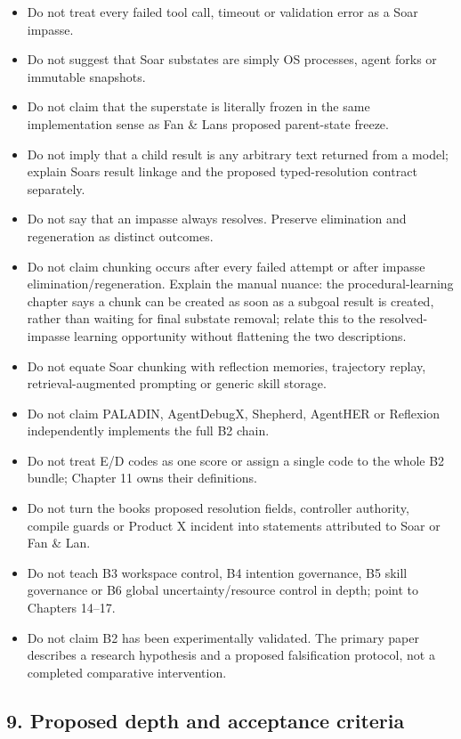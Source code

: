 \begin{itemize}
\tightlist
\item
  Do not treat every failed tool call, timeout or validation error as a Soar impasse.
\item
  Do not suggest that Soar substates are simply OS processes, agent forks or immutable snapshots.
\item
  Do not claim that the superstate is literally frozen in the same implementation sense as Fan \& Lan\textquotesingle s proposed parent-state freeze.
\item
  Do not imply that a child result is any arbitrary text returned from a model; explain Soar\textquotesingle s result linkage and the proposed typed-resolution contract separately.
\item
  Do not say that an impasse always resolves. Preserve elimination and regeneration as distinct outcomes.
\item
  Do not claim chunking occurs after every failed attempt or after impasse elimination/regeneration. Explain the manual nuance: the procedural-learning chapter says a chunk can be created as soon as a subgoal result is created, rather than waiting for final substate removal; relate this to the resolved-impasse learning opportunity without flattening the two descriptions.
\item
  Do not equate Soar chunking with reflection memories, trajectory replay, retrieval-augmented prompting or generic skill storage.
\item
  Do not claim PALADIN, AgentDebugX, Shepherd, AgentHER or Reflexion independently implements the full B2 chain.
\item
  Do not treat E/D codes as one score or assign a single code to the whole B2 bundle; Chapter 11 owns their definitions.
\item
  Do not turn the book\textquotesingle s proposed resolution fields, controller authority, compile guards or Product X incident into statements attributed to Soar or Fan \& Lan.
\item
  Do not teach B3 workspace control, B4 intention governance, B5 skill governance or B6 global uncertainty/resource control in depth; point to Chapters 14--17.
\item
  Do not claim B2 has been experimentally validated. The primary paper describes a research hypothesis and a proposed falsification protocol, not a completed comparative intervention.
\end{itemize}

\subsection{9. Proposed depth and acceptance criteria}\label{9-proposed-depth-and-acceptance-criteria}

